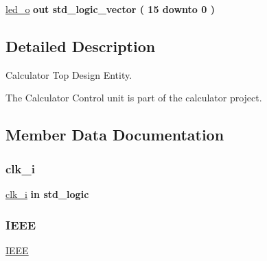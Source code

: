 \begin{DoxyCompactItemize}
\item 
\hyperlink{classcalc__top_ae622b8b55ca985e4965d79aab895a746}{led\+\_\+o}  {\bfseries {\bfseries \textcolor{keywordflow}{out}\textcolor{vhdlchar}{ }}} {\bfseries \textcolor{comment}{std\+\_\+logic\+\_\+vector}\textcolor{vhdlchar}{ }\textcolor{vhdlchar}{(}\textcolor{vhdlchar}{ }\textcolor{vhdlchar}{ } \textcolor{vhdldigit}{15} \textcolor{vhdlchar}{ }\textcolor{keywordflow}{downto}\textcolor{vhdlchar}{ }\textcolor{vhdlchar}{ } \textcolor{vhdldigit}{0} \textcolor{vhdlchar}{ }\textcolor{vhdlchar}{)}\textcolor{vhdlchar}{ }} 
\end{DoxyCompactItemize}


\subsection{Detailed Description}
Calculator Top Design Entity. 

The Calculator Control unit is part of the calculator project. 

\subsection{Member Data Documentation}
\mbox{\label{classcalc__top_abe949478e3f8aad0a6aeb1842fa6c608}} 
\subsubsection{\texorpdfstring{clk\+\_\+i}{clk\_i}}
{\footnotesize\ttfamily \hyperlink{classcalc__top_abe949478e3f8aad0a6aeb1842fa6c608}{clk\+\_\+i} {\bfseries \textcolor{keywordflow}{in}\textcolor{vhdlchar}{ }} {\bfseries \textcolor{comment}{std\+\_\+logic}\textcolor{vhdlchar}{ }} \hspace{0.3cm}{\ttfamily [Port]}}

\mbox{\label{classcalc__top_ae4f03c286607f3181e16b9aa12d0c6d4}} 
\subsubsection{\texorpdfstring{I\+E\+EE}{IEEE}}
{\footnotesize\ttfamily \hyperlink{classcalc__top_ae4f03c286607f3181e16b9aa12d0c6d4}{I\+E\+EE}\hspace{0.3cm}{\ttfamily [Library]}}

